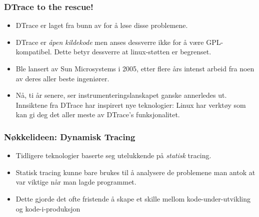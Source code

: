 \documentclass{beamer}
\begin{document}
\begin{frame}
    \frametitle{DTrace to the rescue!}

    \begin{itemize}
\item DTrace er laget fra bunn av for å løse disse problemene.

\item DTrace er \emph{åpen kildekode} men anses dessverre ikke for å være GPL-kompatibel.
    Dette betyr dessverre at linux-støtten er begrenset.

\item Ble lansert av Sun Microsystems i 2005, etter flere års intenst arbeid
      fra noen av deres aller beste ingeniører.

  \item Nå, ti år senere, ser instrumenteringslanskapet ganske annerledes ut.
      Innsiktene fra DTrace har inspirert nye teknologier: Linux har verktøy
      som kan gi deg det aller meste av DTrace's funksjonalitet.
    \end{itemize}

\end{frame}

\begin{frame}
    \frametitle{Nøkkelideen: Dynamisk Tracing}
    \begin{itemize}
        \item Tidligere teknologier baserte seg utelukkende på \emph{statisk} tracing.

        \item Statisk tracing kunne bare brukes til å analysere de problemene man
            antok at var viktige når man lagde programmet.

        \item Dette gjorde det ofte fristende å skape et skille mellom
              kode-under-utvikling og kode-i-produksjon
    \end{itemize}

\end{frame}
\end{document}
